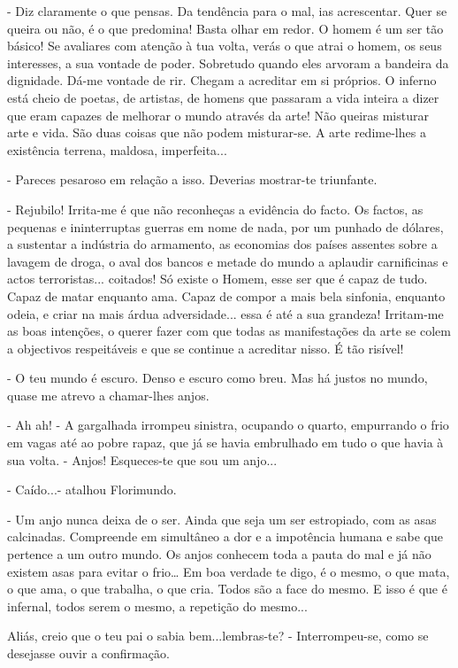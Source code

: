 - Diz claramente o que pensas. Da tendência para o mal, ias acrescentar.
Quer se queira ou não, é o que predomina! Basta olhar em redor. O homem
é um ser tão básico! Se avaliares com atenção à tua volta, verás o que
atrai o homem, os seus interesses, a sua vontade de poder. Sobretudo
quando eles arvoram a bandeira da dignidade. Dá-me vontade de rir.
Chegam a acreditar em si próprios. O inferno está cheio de poetas, de
artistas, de homens que passaram a vida inteira a dizer que eram capazes
de melhorar o mundo através da arte! Não queiras misturar arte e vida.
São duas coisas que não podem misturar-se. A arte redime-lhes a
existência terrena, maldosa, imperfeita...

- Pareces pesaroso em relação a isso. Deverias mostrar-te triunfante.

- Rejubilo! Irrita-me é que não reconheças a evidência do facto. Os
factos, as pequenas e ininterruptas guerras em nome de nada, por um
punhado de dólares, a sustentar a indústria do armamento, as economias
dos países assentes sobre a lavagem de droga, o aval dos bancos e metade
do mundo a aplaudir carnificinas e actos terroristas... coitados! Só
existe o Homem, esse ser que é capaz de tudo. Capaz de matar enquanto
ama. Capaz de compor a mais bela sinfonia, enquanto odeia, e criar na
mais árdua adversidade... essa é até a sua grandeza! Irritam-me as boas
intenções, o querer fazer com que todas as manifestações da arte se
colem a objectivos respeitáveis e que se continue a acreditar nisso. É
tão risível!

- O teu mundo é escuro. Denso e escuro como breu. Mas há justos no
mundo, quase me atrevo a chamar-lhes anjos.

- Ah ah! - A gargalhada irrompeu sinistra, ocupando o quarto, empurrando
o frio em vagas até ao pobre rapaz, que já se havia embrulhado em tudo o
que havia à sua volta. - Anjos! Esqueces-te que sou um anjo...

- Caído...- atalhou Florimundo.

- Um anjo nunca deixa de o ser. Ainda que seja um ser estropiado, com as
asas calcinadas. Compreende em simultâneo a dor e a impotência humana e
sabe que pertence a um outro mundo. Os anjos conhecem toda a pauta do
mal e já não existem asas para evitar o frio\ldots{} Em boa verdade te
digo, é o mesmo, o que mata, o que ama, o que trabalha, o que cria.
Todos são a face do mesmo. E isso é que é infernal, todos serem o mesmo,
a repetição do mesmo...

Aliás, creio que o teu pai o sabia bem...lembras-te? - Interrompeu-se,
como se desejasse ouvir a confirmação.

